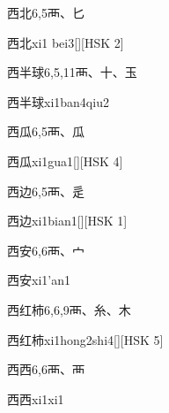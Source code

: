 \begin{Entry}{西北}{6,5}{⾑、⼔}
  \begin{Phonetics}{西北}{xi1 bei3}[][HSK 2]
  \end{Phonetics}
\end{Entry}

\begin{Entry}{西半球}{6,5,11}{⾑、⼗、⽟}
  \begin{Phonetics}{西半球}{xi1ban4qiu2}
  \end{Phonetics}
\end{Entry}

\begin{Entry}{西瓜}{6,5}{⾑、⽠}
  \begin{Phonetics}{西瓜}{xi1gua1}[][HSK 4]
  \end{Phonetics}
\end{Entry}

\begin{Entry}{西边}{6,5}{⾑、⾡}
  \begin{Phonetics}{西边}{xi1bian1}[][HSK 1]
  \end{Phonetics}
\end{Entry}

\begin{Entry}{西安}{6,6}{⾑、⼧}
  \begin{Phonetics}{西安}{xi1'an1}
  \end{Phonetics}
\end{Entry}

\begin{Entry}{西红柿}{6,6,9}{⾑、⽷、⽊}
  \begin{Phonetics}{西红柿}{xi1hong2shi4}[][HSK 5]
  \end{Phonetics}
\end{Entry}

\begin{Entry}{西西}{6,6}{⾑、⾑}
  \begin{Phonetics}{西西}{xi1xi1}
  \end{Phonetics}
\end{Entry}

